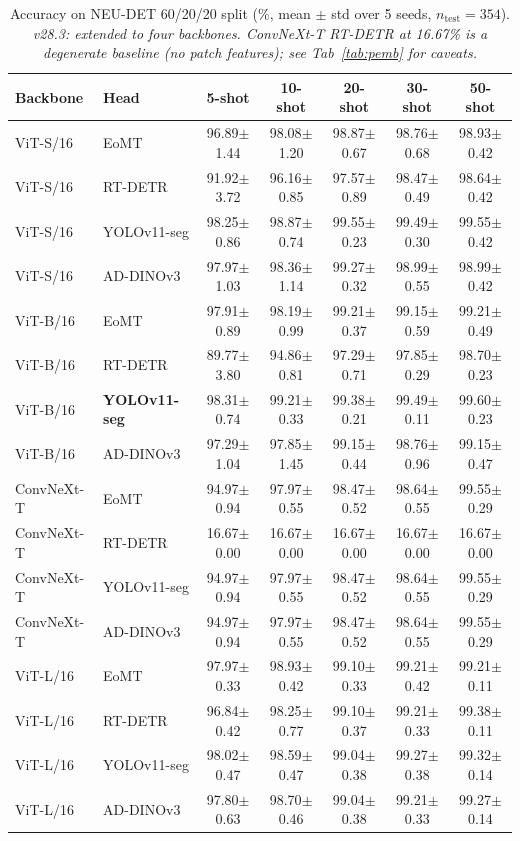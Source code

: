 \documentclass[journal]{IEEEtran}
\begin{document}
\begin{table}[!ht]
\centering
\caption{Accuracy on NEU-DET 60/20/20 split (\%, mean $\pm$ std over 5 seeds, $n_{\text{test}}=354$). \emph{v28.3: extended to four backbones. ConvNeXt-T RT-DETR at 16.67\% is a degenerate baseline (no patch features); see Tab~\ref{tab:pemb} for caveats.}}
\label{tab:neu-det}
\begin{tabular}{llccccc}
\toprule
Backbone & Head & 5-shot & 10-shot & 20-shot & 30-shot & 50-shot \\
\midrule
ViT-S/16       & EoMT        & 96.89$\pm$1.44 & 98.08$\pm$1.20 & 98.87$\pm$0.67 & 98.76$\pm$0.68 & 98.93$\pm$0.42 \\
ViT-S/16       & RT-DETR     & 91.92$\pm$3.72 & 96.16$\pm$0.85 & 97.57$\pm$0.89 & 98.47$\pm$0.49 & 98.64$\pm$0.42 \\
ViT-S/16       & YOLOv11-seg & 98.25$\pm$0.86 & 98.87$\pm$0.74 & 99.55$\pm$0.23 & 99.49$\pm$0.30 & 99.55$\pm$0.42 \\
ViT-S/16       & AD-DINOv3   & 97.97$\pm$1.03 & 98.36$\pm$1.14 & 99.27$\pm$0.32 & 98.99$\pm$0.55 & 98.99$\pm$0.42 \\
\midrule
ViT-B/16       & EoMT        & 97.91$\pm$0.89 & 98.19$\pm$0.99 & 99.21$\pm$0.37 & 99.15$\pm$0.59 & 99.21$\pm$0.49 \\
ViT-B/16       & RT-DETR     & 89.77$\pm$3.80 & 94.86$\pm$0.81 & 97.29$\pm$0.71 & 97.85$\pm$0.29 & 98.70$\pm$0.23 \\
ViT-B/16       & \textbf{YOLOv11-seg} & 98.31$\pm$0.74 & 99.21$\pm$0.33 & 99.38$\pm$0.21 & 99.49$\pm$0.11 & 99.60$\pm$0.23 \\
ViT-B/16       & AD-DINOv3   & 97.29$\pm$1.04 & 97.85$\pm$1.45 & 99.15$\pm$0.44 & 98.76$\pm$0.96 & 99.15$\pm$0.47 \\
\midrule
ConvNeXt-T     & EoMT        & 94.97$\pm$0.94 & 97.97$\pm$0.55 & 98.47$\pm$0.52 & 98.64$\pm$0.55 & 99.55$\pm$0.29 \\
ConvNeXt-T     & RT-DETR     & 16.67$\pm$0.00 & 16.67$\pm$0.00 & 16.67$\pm$0.00 & 16.67$\pm$0.00 & 16.67$\pm$0.00 \\
ConvNeXt-T     & YOLOv11-seg & 94.97$\pm$0.94 & 97.97$\pm$0.55 & 98.47$\pm$0.52 & 98.64$\pm$0.55 & 99.55$\pm$0.29 \\
ConvNeXt-T     & AD-DINOv3   & 94.97$\pm$0.94 & 97.97$\pm$0.55 & 98.47$\pm$0.52 & 98.64$\pm$0.55 & 99.55$\pm$0.29 \\
\midrule
ViT-L/16       & EoMT        & 97.97$\pm$0.33 & 98.93$\pm$0.42 & 99.10$\pm$0.33 & 99.21$\pm$0.42 & 99.21$\pm$0.11 \\
ViT-L/16       & RT-DETR     & 96.84$\pm$0.42 & 98.25$\pm$0.77 & 99.10$\pm$0.37 & 99.21$\pm$0.33 & 99.38$\pm$0.11 \\
ViT-L/16       & YOLOv11-seg & 98.02$\pm$0.47 & 98.59$\pm$0.47 & 99.04$\pm$0.38 & 99.27$\pm$0.38 & 99.32$\pm$0.14 \\
ViT-L/16       & AD-DINOv3   & 97.80$\pm$0.63 & 98.70$\pm$0.46 & 99.04$\pm$0.38 & 99.21$\pm$0.33 & 99.27$\pm$0.14 \\
\bottomrule
\end{tabular}
\end{table}
\end{document}
